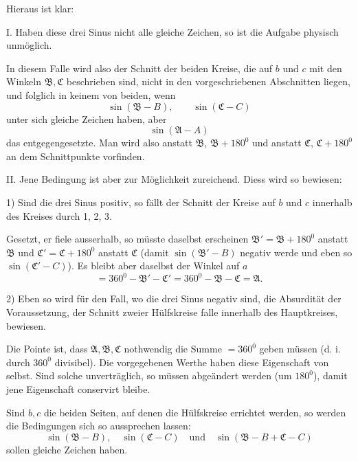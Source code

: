 
Hieraus ist klar:

I. Haben diese drei Sinus nicht alle gleiche Zeichen, so ist die Aufgabe physisch unmöglich.

In diesem Falle wird also der Schnitt der beiden Kreise, die auf $b$ und $c$ mit den Winkeln $\mathfrak{B}, \mathfrak{C}$ beschrieben sind, nicht in den vorgeschriebenen Abschnitten liegen, und folglich in keinem von beiden, wenn
\[ \sin(\mathfrak{B}-B), \qquad \sin(\mathfrak{C}-C) \]
unter sich gleiche Zeichen haben, aber
\[ \sin(\mathfrak{A}-A) \]
das entgegengesetzte. Man wird also anstatt $\mathfrak{B}$, $\mathfrak{B}+180^0$ und anstatt $\mathfrak{C}$, $\mathfrak{C}+180^0$ an dem Schnittpunkte vorfinden.

II. Jene Bedingung ist aber zur Möglichkeit zureichend. Diess wird so bewiesen:

1) Sind die drei Sinus positiv, so fällt der Schnitt der Kreise auf $b$ und $c$ innerhalb des Kreises durch 1, 2, 3.

 Gesetzt, er fiele ausserhalb, so müsste daselbst erscheinen $\mathfrak{B}' = \mathfrak{B}+180^0$ anstatt $\mathfrak{B}$ und $\mathfrak{C}' = \mathfrak{C}+180^0$ anstatt $\mathfrak{C}$ (damit $\sin(\mathfrak{B}'-B)$ negativ werde und eben so $\sin(\mathfrak{C}'-C)$). Es bleibt aber daselbst der Winkel auf $a$
\[ =360^0-\mathfrak{B}'-\mathfrak{C}'=360^0-\mathfrak{B}-\mathfrak{C}=\mathfrak{A}. \]

2) Eben so wird für den Fall, wo die drei Sinus negativ sind, die Absurdität der Voraussetzung, der Schnitt zweier Hülfskreise falle innerhalb des Hauptkreises, bewiesen.

Die Pointe ist, dass $\mathfrak{A}, \mathfrak{B}, \mathfrak{C}$ nothwendig die Summe $=360^0$ geben müssen (d. i. durch $360^0$ divisibel). Die vorgegebenen Werthe haben diese Eigenschaft von selbst. Sind solche unverträglich, so müssen  abgeändert werden (um $180^0$), damit jene Eigenschaft conservirt bleibe.

Sind $b, c$ die beiden Seiten, auf denen die Hülfskreise errichtet werden, so werden die Bedingungen sich so aussprechen lassen:
\[ \sin(\mathfrak{B}-B), \quad \sin(\mathfrak{C}-C) \quad \text{und} \quad \sin(\mathfrak{B}-B+\mathfrak{C}-C) \]
sollen gleiche Zeichen haben.
